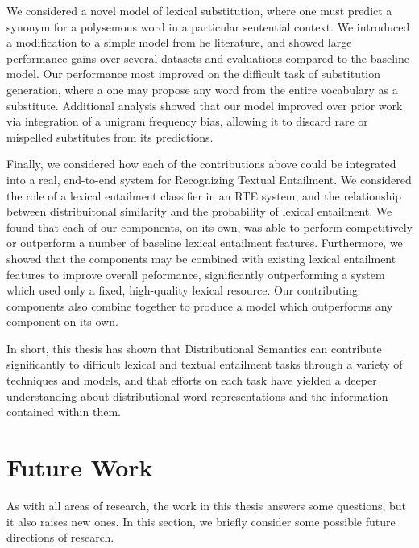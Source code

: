 We considered a novel model of lexical substitution, where one must predict
a synonym for a polysemous word in a particular sentential context. We introduced
a modification to a simple model from he literature, and showed
large performance gains over several datasets and evaluations compared to the
baseline model. Our performance most improved on the difficult task of
substitution generation, where a one may propose any word from the entire
vocabulary as a substitute. Additional analysis showed that our model improved
over prior work via integration of a unigram frequency bias, allowing
it to discard rare or mispelled substitutes from its predictions.

Finally, we considered how each of the contributions above could be integrated
into a real, end-to-end system for Recognizing Textual Entailment. We considered
the role of a lexical entailment classifier in an RTE system, and the
relationship between distribuitonal similarity and the probability of lexical
entailment. We found that each of our components, on its own, was able to
perform competitively or outperform a number of baseline lexical entailment
features. Furthermore, we showed that the components may be combined with
existing lexical entailment features to improve overall peformance,
significantly outperforming a system which used only a fixed, high-quality
lexical resource. Our contributing components also combine together to produce
a model which outperforms any component on its own.

In short, this thesis has shown that Distributional Semantics can contribute
significantly to difficult lexical and textual entailment tasks through a
variety of techniques and models, and that efforts on each task have yielded
a deeper understanding about distributional word representations and the
information contained within them.


\section{Future Work}

As with all areas of research, the work in this thesis answers some questions,
but it also raises new ones. In this section, we briefly consider some possible
future directions of research.


